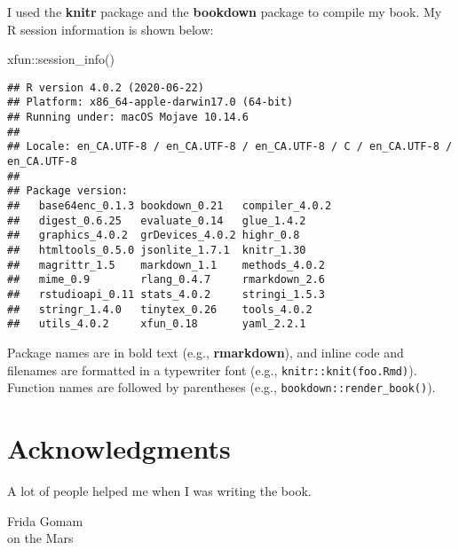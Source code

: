 \documentclass[
]{krantz}
\makeatletter
\newenvironment{Shaded}{\begin{snugshade}}{\end{snugshade}}
\newcommand{\FunctionTok}[1]{\textcolor[rgb]{0,0,0}{#1}}
\newcommand{\NormalTok}[1]{#1}
\newcommand{\SpecialCharTok}[1]{\textcolor[rgb]{0,0,0}{#1}}
\newenvironment{kframe}{%
\medskip{}
\setlength{\fboxsep}{.8em}
 \def\at@end@of@kframe{}%
 \ifinner\ifhmode%
  \def\at@end@of@kframe{\end{minipage}}%
  \begin{minipage}{\columnwidth}%
 \fi\fi%
 \def\FrameCommand##1{\hskip\@totalleftmargin \hskip-\fboxsep
 \colorbox{shadecolor}{##1}\hskip-\fboxsep
     \hskip-\linewidth \hskip-\@totalleftmargin \hskip\columnwidth}%
 \MakeFramed {\advance\hsize-\width
   \@totalleftmargin\z@ \linewidth\hsize
   \@setminipage}}%
 {\par\unskip\endMakeFramed%
 \at@end@of@kframe}
\renewenvironment{Shaded}{\begin{kframe}}{\end{kframe}}
\makeatother
\begin{document}
I used the \textbf{knitr} package \citep{xie2015} and the \textbf{bookdown} package \citep{R-bookdown} to compile my book. My R session information is shown below:

\begin{Shaded}
\begin{Highlighting}[]
\NormalTok{xfun}\SpecialCharTok{::}\FunctionTok{session\_info}\NormalTok{()}
\end{Highlighting}
\end{Shaded}

\begin{verbatim}
## R version 4.0.2 (2020-06-22)
## Platform: x86_64-apple-darwin17.0 (64-bit)
## Running under: macOS Mojave 10.14.6
## 
## Locale: en_CA.UTF-8 / en_CA.UTF-8 / en_CA.UTF-8 / C / en_CA.UTF-8 / en_CA.UTF-8
## 
## Package version:
##   base64enc_0.1.3 bookdown_0.21   compiler_4.0.2 
##   digest_0.6.25   evaluate_0.14   glue_1.4.2     
##   graphics_4.0.2  grDevices_4.0.2 highr_0.8      
##   htmltools_0.5.0 jsonlite_1.7.1  knitr_1.30     
##   magrittr_1.5    markdown_1.1    methods_4.0.2  
##   mime_0.9        rlang_0.4.7     rmarkdown_2.6  
##   rstudioapi_0.11 stats_4.0.2     stringi_1.5.3  
##   stringr_1.4.0   tinytex_0.26    tools_4.0.2    
##   utils_4.0.2     xfun_0.18       yaml_2.2.1
\end{verbatim}

Package names are in bold text (e.g., \textbf{rmarkdown}), and inline code and filenames are formatted in a typewriter font (e.g., \texttt{knitr::knit(\textquotesingle{}foo.Rmd\textquotesingle{})}). Function names are followed by parentheses (e.g., \texttt{bookdown::render\_book()}).

\hypertarget{acknowledgments}{%
\section*{Acknowledgments}\label{acknowledgments}}


A lot of people helped me when I was writing the book.

\begin{flushright}
Frida Gomam\\
on the Mars
\end{flushright}

  

\backmatter
\printindex
\end{document}

